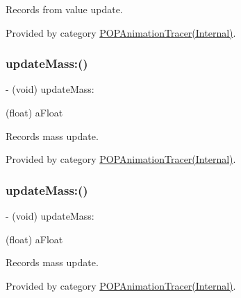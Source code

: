 Records from value update. 

Provided by category \mbox{\hyperlink{category_p_o_p_animation_tracer_07_internal_08_aa5cc867da95a73d3254f38a86281233a}{P\+O\+P\+Animation\+Tracer(\+Internal)}}.

\mbox{\label{interface_p_o_p_animation_tracer_a1e41c2f1b7c5332730d2c834e0420367}} 
\subsubsection{\texorpdfstring{update\+Mass\+:()}{updateMass:()}\hspace{0.1cm}{\footnotesize\ttfamily [1/2]}}
{\footnotesize\ttfamily -\/ (void) update\+Mass\+: \begin{DoxyParamCaption}\item[{(float)}]{a\+Float }\end{DoxyParamCaption}}

Records mass update. 

Provided by category \mbox{\hyperlink{category_p_o_p_animation_tracer_07_internal_08_a1e41c2f1b7c5332730d2c834e0420367}{P\+O\+P\+Animation\+Tracer(\+Internal)}}.

\mbox{\label{interface_p_o_p_animation_tracer_a1e41c2f1b7c5332730d2c834e0420367}} 
\subsubsection{\texorpdfstring{update\+Mass\+:()}{updateMass:()}\hspace{0.1cm}{\footnotesize\ttfamily [2/2]}}
{\footnotesize\ttfamily -\/ (void) update\+Mass\+: \begin{DoxyParamCaption}\item[{(float)}]{a\+Float }\end{DoxyParamCaption}}

Records mass update. 

Provided by category \mbox{\hyperlink{category_p_o_p_animation_tracer_07_internal_08_a1e41c2f1b7c5332730d2c834e0420367}{P\+O\+P\+Animation\+Tracer(\+Internal)}}.

